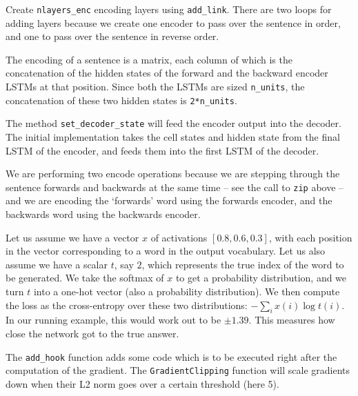 \documentclass[answers]{exam}
\begin{document}
\begin{CJK}{UTF8}{min}
\begin{questions}

\begin{framed}
\begin{compactenum}[A.]
  \item
    Create \texttt{nlayers\_enc} encoding layers using \texttt{add\_link}. There
    are two loops for adding layers because we create one encoder to pass over
    the sentence in order, and one to pass over the sentence in reverse order.
  \item
    The encoding of a sentence is a matrix, each column of which is the
    concatenation of the hidden states of the forward and the backward encoder
    LSTMs at that position. Since both the LSTMs are sized \texttt{n\_units},
    the concatenation of these two hidden states is \texttt{2*n\_units}.
  \item
    The method \texttt{set\_decoder\_state} will feed the encoder output into
    the decoder. The initial implementation takes the cell states and hidden
    state from the final LSTM of the encoder, and feeds them into the first LSTM
    of the decoder.
  \item
    We are performing two encode operations because we are stepping through the
    sentence forwards and backwards at the same time -- see the call to
    \texttt{zip} above -- and we are encoding the `forwards' word using the
    forwards encoder, and the backwards word using the backwards encoder.
  \item
    Let us assume we have a vector $x$ of activations $[0.8, 0.6, 0.3]$,
    with each position in the vector corresponding to a word in
    the output vocabulary. Let us also assume we have a scalar $t$, say $2$,
    which represents the true index of the word to be generated.
    We take the softmax of $x$ to get a probability distribution, and we turn
    $t$ into a one-hot vector (also a probability distribution).
    We then compute the loss as the cross-entropy over these two distributions:
    $-\sum_{i} x(i) \log{t(i)}$. In our running example, this would work out to
    be $\pm 1.39$. This measures how close the network got to the true answer.
  \item
    The \texttt{add\_hook} function adds some code which is to be executed right
    after the computation of the gradient. The \texttt{GradientClipping}
    function will scale gradients down when their L2 norm goes over a certain
    threshold (here 5).
\end{compactenum}
\end{framed}



\end{questions}
\end{CJK}
\end{document}
